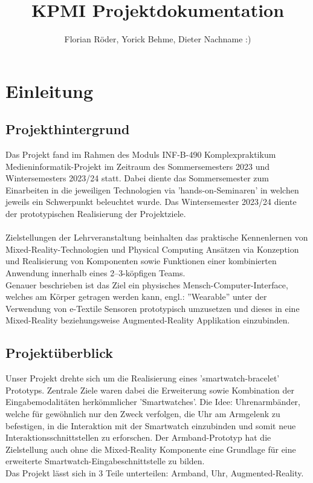 \documentclass[12pt, a4paper]{article}
\begin{document}
\author{Florian Röder, Yorick Behme, Dieter Nachname :)}
\title{KPMI Projektdokumentation}
\maketitle
\setcounter{tocdepth}{4}
\setcounter{secnumdepth}{4}
\tableofcontents

\newpage

\section{Einleitung}

\subsection{Projekthintergrund}

Das Projekt fand im Rahmen des Moduls INF-B-490 Komplexpraktikum Medieninformatik-Projekt im Zeitraum des Sommersemesters 2023 und Wintersemesters 2023/24 statt. Dabei diente das Sommersemester zum Einarbeiten in die jeweiligen Technologien via 'hands-on-Seminaren' in welchen jeweils ein Schwerpunkt beleuchtet wurde. Das Wintersemester 2023/24 diente der prototypischen Realisierung der Projektziele.\\
\\
Zielstellungen der Lehrveranstaltung beinhalten das praktische Kennenlernen von Mixed-Reality-Technologien und Physical Computing Ansätzen via Konzeption und Realisierung von Komponenten sowie Funktionen einer kombinierten Anwendung innerhalb eines 2–3-köpfigen Teams.\\
Genauer beschrieben ist das Ziel ein physisches Mensch-Computer-Interface, welches am Körper getragen werden kann, engl.: ''Wearable'' unter der Verwendung von e-Textile Sensoren prototypisch umzusetzen und dieses in eine Mixed-Reality beziehungsweise Augmented-Reality Applikation einzubinden.

\subsection{Projektüberblick}

Unser Projekt drehte sich um die Realisierung eines 'smartwatch-bracelet' Prototyps. Zentrale Ziele waren dabei die Erweiterung sowie Kombination der Eingabemodalitäten herkömmlicher 'Smartwatches'. Die Idee: Uhrenarmbänder, welche für gewöhnlich nur den Zweck verfolgen, die Uhr am Armgelenk zu befestigen, in die Interaktion mit der Smartwatch einzubinden und somit neue Interaktionsschnittstellen zu erforschen. Der Armband-Prototyp hat die Zielstellung auch ohne die Mixed-Reality Komponente eine Grundlage für eine erweiterte Smartwatch-Eingabeschnittstelle zu bilden.\\
Das Projekt lässt sich in 3 Teile unterteilen: Armband, Uhr, Augmented-Reality.
\end{document}
